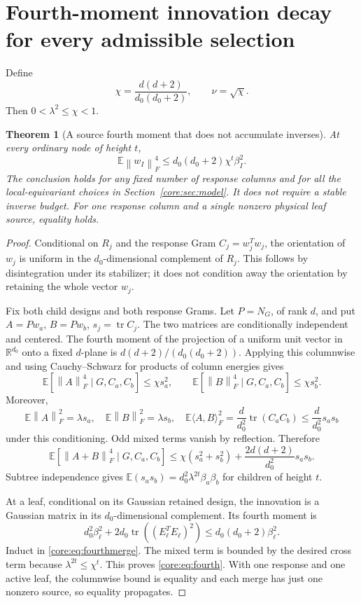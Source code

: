 \documentclass[11pt,oneside,openany,a4paper]{book}
\numberwithin{equation}{chapter}
\newtheorem{theorem}{Theorem}[chapter]
\theoremstyle{definition}
\theoremstyle{remark}
\newcommand{\R}{\mathbb R}\newcommand{\E}{\mathbb E}\newcommand{\Prb}{\mathbb P}\newcommand{\PP}{\mathbb P}
\newcommand{\F}[1]{\left\lVert#1\right\rVert_F}
\DeclareMathOperator{\tr}{tr}\DeclareMathOperator{\rank}{rank}
\begin{document}
\section{Fourth-moment innovation decay for every admissible selection}\label{core:sec:fourth}
Define
\begin{equation}\label{core:eq:chi}
 \chi=\frac{d(d+2)}{d_0(d_0+2)},\qquad \nu=\sqrt\chi.
\end{equation}
Then $0<\lambda^2\le\chi<1$.

\begin{theorem}[A source fourth moment that does not accumulate inverses]\label{core:thm:fourth}
At every ordinary node of height $t$,
\begin{equation}\label{core:eq:fourth}
 \boxed{\E\F{w_I}^4\le d_0(d_0+2)\chi^t\beta_I^2.}
\end{equation}
The conclusion holds for any fixed number of response columns and for all the local-equivariant choices in Section~\ref{core:sec:model}. It does not require a stable inverse budget. For one response column and a single nonzero physical leaf source, equality holds.
\end{theorem}
\begin{proof}
Conditional on $R_j$ and the response Gram $C_j=w_j^Tw_j$, the orientation of $w_j$ is uniform in the $d_0$-dimensional complement of $R_j$. This follows by disintegration under its stabilizer; it does not condition away the orientation by retaining the whole vector $w_j$.

Fix both child designs and both response Grams. Let $P=N_G$, of rank $d$, and put $A=Pw_a$, $B=Pw_b$, $s_j=\tr C_j$. The two matrices are conditionally independent and centered. The fourth moment of the projection of a uniform unit vector in $\R^{d_0}$ onto a fixed $d$-plane is $d(d+2)/(d_0(d_0+2))$. Applying this columnwise and using Cauchy--Schwarz for products of column energies gives
\[
 \E[\F A^4\mid G,C_a,C_b]\le\chi s_a^2,
 \qquad \E[\F B^4\mid G,C_a,C_b]\le\chi s_b^2.
\]
Moreover,
\[
 \E\F A^2=\lambda s_a,\quad \E\F B^2=\lambda s_b,\quad
 \E\langle A,B\rangle_F^2=\frac d{d_0^2}\tr(C_aC_b)
 \le\frac d{d_0^2}s_as_b
\]
under this conditioning. Odd mixed terms vanish by reflection. Therefore
\begin{equation}\label{core:eq:fourthmerge}
 \E[\F{A+B}^4\mid G,C_a,C_b]
 \le\chi(s_a^2+s_b^2)+\frac{2d(d+2)}{d_0^2}s_as_b.
\end{equation}
Subtree independence gives $\E(s_as_b)=d_0^2\lambda^{2t}\beta_a\beta_b$ for children of height $t$.

At a leaf, conditional on its Gaussian retained design, the innovation is a Gaussian matrix in its $d_0$-dimensional complement. Its fourth moment is
\[
 d_0^2\beta_\ell^2+2d_0\tr((E_\ell^TE_\ell)^2)
 \le d_0(d_0+2)\beta_\ell^2.
\]
Induct in \eqref{core:eq:fourthmerge}. The mixed term is bounded by the desired cross term because $\lambda^{2t}\le\chi^t$. This proves \eqref{core:eq:fourth}. With one response and one active leaf, the columnwise bound is equality and each merge has just one nonzero source, so equality propagates.
\end{proof}
\end{document}
